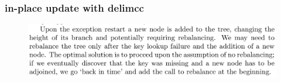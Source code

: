 \documentclass{beamer}
\begin{document}
  \begin{frame}
    \frametitle{in-place update with delimcc}    
    \begin{figure}[ht]
      \begin{center}        
        \includegraphics[width=\textwidth,height=0.8\textheight,keepaspectratio]{pipelinefigures/CodeSamplesDelimCCExplanationIII.pdf}
      \end{center}      
    \end{figure}
  \end{frame}
\end{document}
